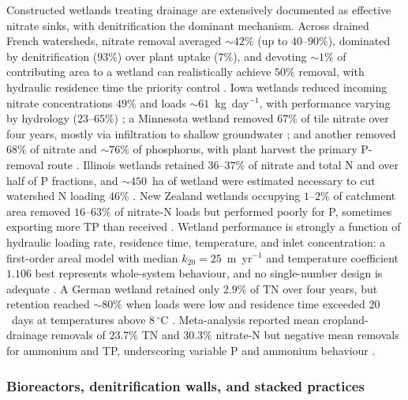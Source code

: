 Constructed wetlands treating drainage are extensively documented as
effective nitrate sinks, with denitrification the dominant mechanism.
Across drained French watersheds, nitrate removal averaged $\sim42\%$ (up
to $40$--$90\%$), dominated by denitrification ($93\%$) over plant uptake
($7\%$), and devoting $\sim1\%$ of contributing area to a wetland can
realistically achieve $50\%$ removal, with hydraulic residence time the
priority control \parencite{Tournebize2017}. Iowa wetlands reduced incoming
nitrate concentrations $49\%$ and loads $\sim61$~kg~day$^{-1}$, with
performance varying by hydrology ($23$--$65\%$) \parencite{Drake2018}; a
Minnesota wetland removed $67\%$ of tile nitrate over four years, mostly
via infiltration to shallow groundwater \parencite{Gordon2021}; and another
removed $68\%$ of nitrate and $\sim76\%$ of phosphorus, with plant harvest
the primary P-removal route \parencite{Lenhart2016}. Illinois wetlands
retained $36$--$37\%$ of nitrate and total N and over half of P fractions,
and $\sim450$~ha of wetland were estimated necessary to cut watershed N
loading $46\%$ \parencite{Kovacic2006}. New Zealand wetlands occupying
$1$--$2\%$ of catchment area removed $16$--$63\%$ of nitrate-N loads but
performed poorly for P, sometimes exporting more TP than received
\parencite{Tanner2005,Tanner2005b,Tanner2011,Tanner2003}. Wetland
performance is strongly a function of hydraulic loading rate, residence
time, temperature, and inlet concentration: a first-order areal model with
median $k_{20}=25$~m~yr$^{-1}$ and temperature coefficient $1.106$ best
represents whole-system behaviour, and no single-number design is adequate
\parencite{Kadlec2012,Kalcic2018}. A German wetland retained only $2.9\%$
of TN over four years, but retention reached $\sim80\%$ when loads were low
and residence time exceeded $20$~days at temperatures above $8\,^{\circ}$C
\parencite{Steidl2019}. Meta-analysis reported mean cropland-drainage
removals of $23.7\%$ TN and $30.3\%$ nitrate-N but negative mean removals
for ammonium and TP, underscoring variable P and ammonium behaviour
\parencite{Messer2021}.

\subsubsection{Bioreactors, denitrification walls, and stacked practices}

